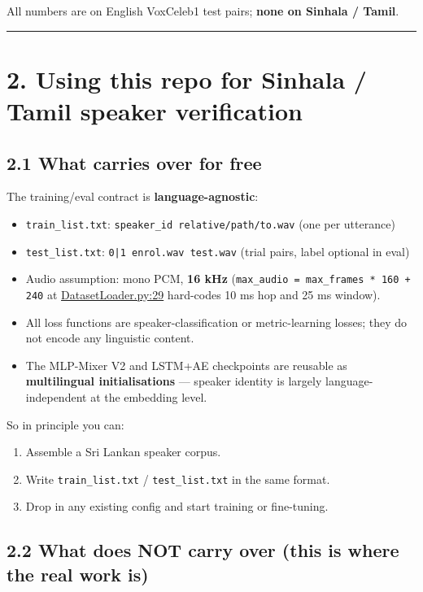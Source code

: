 \documentclass[10pt,a4paper]{article}
\begin{document}
All numbers are on English VoxCeleb1 test pairs; \textbf{none on Sinhala / Tamil}.

\vspace{0.5em}\hrule\vspace{0.5em}

\section*{2. Using this repo for Sinhala / Tamil speaker verification}

\subsection*{2.1 What carries over for free}
The training/eval contract is \textbf{language-agnostic}:

\begin{itemize}[leftmargin=*,itemsep=2pt]
  \item \texttt{train\_list.txt}: \texttt{speaker\_id  relative/path/to.wav} (one per utterance)
  \item \texttt{test\_list.txt}: \texttt{0|1  enrol.wav  test.wav} (trial pairs, label optional in eval)
  \item Audio assumption: mono PCM, \textbf{16 kHz} (\texttt{max\_audio = max\_frames * 160 + 240} at \href{voxceleb_trainer/DatasetLoader.py\#L29}{DatasetLoader.py:29} hard-codes 10 ms hop and 25 ms window).
  \item All loss functions are speaker-classification or metric-learning losses; they do not encode any linguistic content.
  \item The MLP-Mixer V2 and LSTM+AE checkpoints are reusable as \textbf{multilingual initialisations} --- speaker identity is largely language-independent at the embedding level.
\end{itemize}

So in principle you can:
\begin{enumerate}[leftmargin=*,itemsep=2pt]
  \item Assemble a Sri Lankan speaker corpus.
  \item Write \texttt{train\_list.txt} / \texttt{test\_list.txt} in the same format.
  \item Drop in any existing config and start training or fine-tuning.
\end{enumerate}

\subsection*{2.2 What does NOT carry over (this is where the real work is)}
\end{document}
